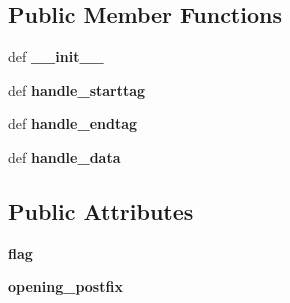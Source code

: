 \subsection*{Public Member Functions}
\begin{DoxyCompactItemize}
\item 
\hypertarget{classfolkekirke__parser_1_1_my_h_t_m_l_parser_ad87df0b816aeb6c53f687c45d9c0a294}{def {\bfseries \-\_\-\-\_\-init\-\_\-\-\_\-}}\label{classfolkekirke__parser_1_1_my_h_t_m_l_parser_ad87df0b816aeb6c53f687c45d9c0a294}

\item 
\hypertarget{classfolkekirke__parser_1_1_my_h_t_m_l_parser_a10f3a83e0efa02b666a95d994dab63ac}{def {\bfseries handle\-\_\-starttag}}\label{classfolkekirke__parser_1_1_my_h_t_m_l_parser_a10f3a83e0efa02b666a95d994dab63ac}

\item 
\hypertarget{classfolkekirke__parser_1_1_my_h_t_m_l_parser_a5ba6fc720b56c39a8a99d3851b1f4b39}{def {\bfseries handle\-\_\-endtag}}\label{classfolkekirke__parser_1_1_my_h_t_m_l_parser_a5ba6fc720b56c39a8a99d3851b1f4b39}

\item 
\hypertarget{classfolkekirke__parser_1_1_my_h_t_m_l_parser_ace3e593608ac44eb2b95b1273dde2f24}{def {\bfseries handle\-\_\-data}}\label{classfolkekirke__parser_1_1_my_h_t_m_l_parser_ace3e593608ac44eb2b95b1273dde2f24}

\end{DoxyCompactItemize}
\subsection*{Public Attributes}
\begin{DoxyCompactItemize}
\item 
\hypertarget{classfolkekirke__parser_1_1_my_h_t_m_l_parser_a20a649007f9f792b62d64a27ae58ea0b}{{\bfseries flag}}\label{classfolkekirke__parser_1_1_my_h_t_m_l_parser_a20a649007f9f792b62d64a27ae58ea0b}

\item 
\hypertarget{classfolkekirke__parser_1_1_my_h_t_m_l_parser_a9c413df5d38a01cda2d2b3f96a3cbc23}{{\bfseries opening\-\_\-postfix}}\label{classfolkekirke__parser_1_1_my_h_t_m_l_parser_a9c413df5d38a01cda2d2b3f96a3cbc23}

\end{DoxyCompactItemize}

